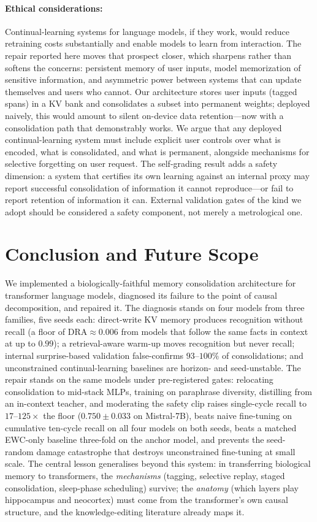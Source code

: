 \paragraph{Ethical considerations:}
Continual-learning systems for language models, if they work, would reduce retraining costs substantially and enable models to learn from interaction. The repair reported here moves that prospect closer, which sharpens rather than softens the concerns: persistent memory of user inputs, model memorization of sensitive information, and asymmetric power between systems that can update themselves and users who cannot. Our architecture stores user inputs (tagged spans) in a KV bank and consolidates a subset into permanent weights; deployed naively, this would amount to silent on-device data retention---now with a consolidation path that demonstrably works. We argue that any deployed continual-learning system must include explicit user controls over what is encoded, what is consolidated, and what is permanent, alongside mechanisms for selective forgetting on user request. The self-grading result adds a safety dimension: a system that certifies its own learning against an internal proxy may report successful consolidation of information it cannot reproduce---or fail to report retention of information it can. External validation gates of the kind we adopt should be considered a safety component, not merely a metrological one.

\section{Conclusion and Future Scope}
\label{sec:conclusion}

We implemented a biologically-faithful memory consolidation architecture for transformer language models, diagnosed its failure to the point of causal decomposition, and repaired it. The diagnosis stands on four models from three families, five seeds each: direct-write KV memory produces recognition without recall (a floor of $\mathrm{DRA}\approx 0.006$ from models that follow the same facts in context at up to $0.99$); a retrieval-aware warm-up moves recognition but never recall; internal surprise-based validation false-confirms $93$--$100\%$ of consolidations; and unconstrained continual-learning baselines are horizon- and seed-unstable. The repair stands on the same models under pre-registered gates: relocating consolidation to mid-stack MLPs, training on paraphrase diversity, distilling from an in-context teacher, and moderating the safety clip raises single-cycle recall to $17$--$125\times$ the floor ($0.750 \pm 0.033$ on Mistral-7B), beats naive fine-tuning on cumulative ten-cycle recall on all four models on both seeds, beats a matched EWC-only baseline three-fold on the anchor model, and prevents the seed-random damage catastrophe that destroys unconstrained fine-tuning at small scale. The central lesson generalises beyond this system: in transferring biological memory to transformers, the \emph{mechanisms} (tagging, selective replay, staged consolidation, sleep-phase scheduling) survive; the \emph{anatomy} (which layers play hippocampus and neocortex) must come from the transformer's own causal structure, and the knowledge-editing literature already maps it.

